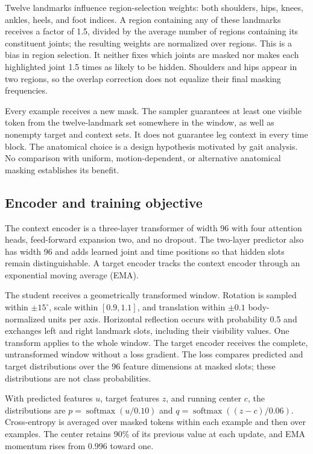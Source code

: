 \documentclass[10pt,twocolumn,letterpaper]{article}
\begin{document}
Twelve landmarks influence region-selection weights: both shoulders, hips, knees, ankles, heels, and foot indices. A region containing any of these landmarks receives a factor of 1.5, divided by the average number of regions containing its constituent joints; the resulting weights are normalized over regions. This is a bias in region selection. It neither fixes which joints are masked nor makes each highlighted joint 1.5 times as likely to be hidden. Shoulders and hips appear in two regions, so the overlap correction does not equalize their final masking frequencies.

Every example receives a new mask. The sampler guarantees at least one visible token from the twelve-landmark set somewhere in the window, as well as nonempty target and context sets. It does not guarantee leg context in every time block. The anatomical choice is a design hypothesis motivated by gait analysis. No comparison with uniform, motion-dependent, or alternative anatomical masking establishes its benefit.

\subsection{Encoder and training objective}
The context encoder is a three-layer transformer of width 96 with four attention heads, feed-forward expansion two, and no dropout. The two-layer predictor also has width 96 and adds learned joint and time positions so that hidden slots remain distinguishable. A target encoder tracks the context encoder through an exponential moving average (EMA).

The student receives a geometrically transformed window. Rotation is sampled within $\pm15^\circ$, scale within $[0.9,1.1]$, and translation within $\pm0.1$ body-normalized units per axis. Horizontal reflection occurs with probability 0.5 and exchanges left and right landmark slots, including their visibility values. One transform applies to the whole window. The target encoder receives the complete, untransformed window without a loss gradient. The loss compares predicted and target distributions over the 96 feature dimensions at masked slots; these distributions are not class probabilities.

With predicted features $u$, target features $z$, and running center $c$, the distributions are $p=\operatorname{softmax}(u/0.10)$ and $q=\operatorname{softmax}((z-c)/0.06)$. Cross-entropy is averaged over masked tokens within each example and then over examples. The center retains 90\% of its previous value at each update, and EMA momentum rises from 0.996 toward one.
\end{document}

